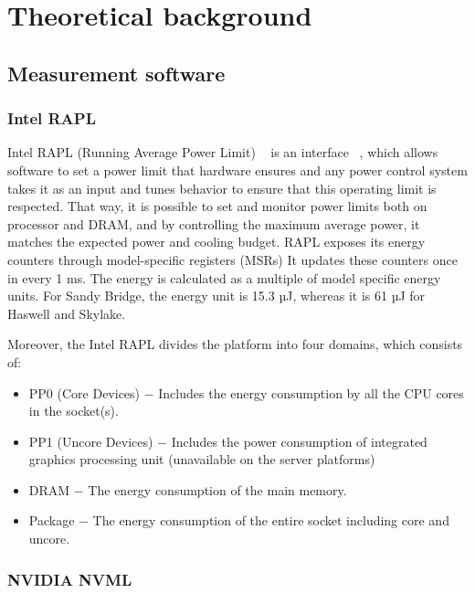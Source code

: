 \chapter{Theoretical background}

\section{Measurement software}

\subsection{Intel RAPL}

Intel RAPL (Running Average Power Limit)
~\cite{Power_Management_on_Intel_Microprocessor} is an interface
~\cite{RAPL_Power_Estimation_and_Capping}, which allows
software to set a power limit that hardware ensures and any
power control system takes it as an input and tunes behavior
to ensure that this operating limit is respected.
That way, it is possible to set and monitor power limits both
on processor and DRAM, and by controlling the maximum average
power, it matches the expected power and cooling budget. RAPL
exposes its energy counters through model-specific registers
(MSRs) It updates these counters once in every 1 ms. The energy
is calculated as a multiple of model specific energy units.
For Sandy Bridge, the energy unit is 15.3 µJ, whereas it is 61
µJ for Haswell and Skylake.

Moreover, the Intel RAPL divides the platform into four domains,
which consists of:

\begin{itemize}
    \item PP0 (Core Devices) $-$ Includes the energy consumption
    by all the CPU cores in the socket(s).
    \item PP1 (Uncore Devices) $-$ Includes the power consumption
    of integrated graphics processing unit (unavailable on the
    server platforms)
    \item DRAM $-$ The energy consumption of the main memory.
    \item Package $-$ The energy consumption of the entire socket
    including core and uncore.
\end{itemize}

\subsection{NVIDIA NVML}

